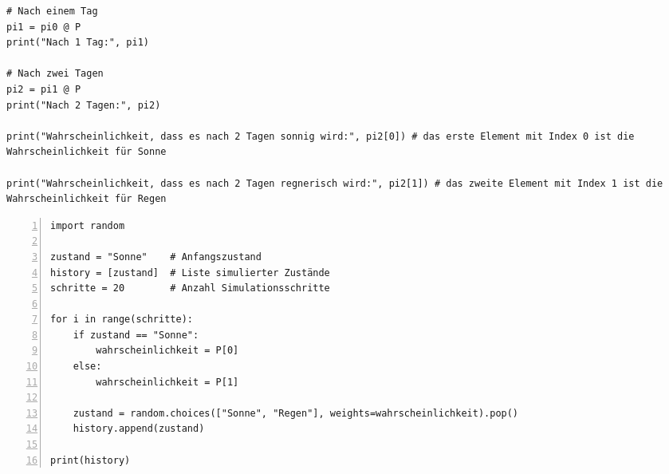 \begin{landscape}
\begin{multicols*}{3}
\begin{cheatSheetBox}[title=Python: Vorhersage von Zuständen]
\begin{lstlisting}
# Nach einem Tag
pi1 = pi0 @ P
print("Nach 1 Tag:", pi1)

# Nach zwei Tagen
pi2 = pi1 @ P
print("Nach 2 Tagen:", pi2)

print("Wahrscheinlichkeit, dass es nach 2 Tagen sonnig wird:", pi2[0]) # das erste Element mit Index 0 ist die Wahrscheinlichkeit für Sonne

print("Wahrscheinlichkeit, dass es nach 2 Tagen regnerisch wird:", pi2[1]) # das zweite Element mit Index 1 ist die Wahrscheinlichkeit für Regen
\end{lstlisting}
    \end{cheatSheetBox}
    \begin{cheatSheetBox}[title=Python: Vorhersage mit Zufallsimulation]
      \begin{lstlisting}[numbers=left]
import random

zustand = "Sonne"    # Anfangszustand
history = [zustand]  # Liste simulierter Zustände
schritte = 20        # Anzahl Simulationsschritte

for i in range(schritte):
    if zustand == "Sonne":
        wahrscheinlichkeit = P[0]
    else:
        wahrscheinlichkeit = P[1]

    zustand = random.choices(["Sonne", "Regen"], weights=wahrscheinlichkeit).pop()
    history.append(zustand)

print(history)
\end{lstlisting}
    \end{cheatSheetBox}
  \end{multicols*}
\end{landscape}